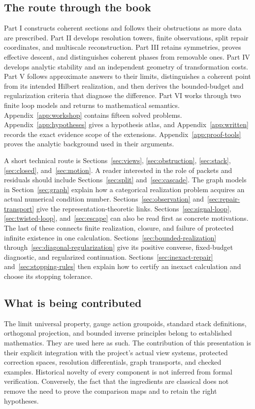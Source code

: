 \documentclass[11pt]{article}
\begin{document}
\subsection*{The route through the book}
Part I constructs coherent sections and follows their obstructions as more data are prescribed. Part II develops resolution towers, finite observations, split repair coordinates, and multiscale reconstruction. Part III retains symmetries, proves effective descent, and distinguishes coherent phases from removable ones. Part IV develops analytic stability and an independent geometry of transformation costs. Part V follows approximate answers to their limits, distinguishes a coherent point from its intended Hilbert realization, and then derives the bounded-budget and regularization criteria that diagnose the difference. Part VI works through two finite loop models and returns to mathematical semantics. Appendix~\ref{app:workshop} contains fifteen solved problems. Appendix~\ref{app:hypotheses} gives a hypothesis atlas, and Appendix~\ref{app:written} records the exact evidence scope of the extensions. Appendix~\ref{app:proof-tools} proves the analytic background used in their arguments.

A short technical route is Sections~\ref{sec:views}, \ref{sec:obstruction}, \ref{sec:stack}, \ref{sec:closed}, and~\ref{sec:motion}. A reader interested in the role of packets and residuals should include Sections~\ref{sec:split} and~\ref{sec:cascade}. The graph models in Section~\ref{sec:graph} explain how a categorical realization problem acquires an actual numerical condition number. Sections~\ref{sec:observation} and~\ref{sec:repair-transport} give the representation-theoretic links. Sections~\ref{sec:signal-loop}, \ref{sec:twisted-loop}, and~\ref{sec:escape} can also be read first as concrete motivations. The last of these connects finite realization, closure, and failure of protected infinite existence in one calculation. Sections~\ref{sec:bounded-realization} through~\ref{sec:diagonal-regularization} give its positive converse, fixed-budget diagnostic, and regularized continuation. Sections~\ref{sec:inexact-repair} and~\ref{sec:stopping-rules} then explain how to certify an inexact calculation and choose its stopping tolerance.

\subsection*{What is being contributed}
The limit universal property, gauge action groupoids, standard stack definitions, orthogonal projection, and bounded inverse principles belong to established mathematics. They are used here as such. The contribution of this presentation is their explicit integration with the project's actual view systems, protected correction spaces, resolution differentials, graph transports, and checked examples. Historical novelty of every component is not inferred from formal verification. Conversely, the fact that the ingredients are classical does not remove the need to prove the comparison maps and to retain the right hypotheses.
\end{document}
